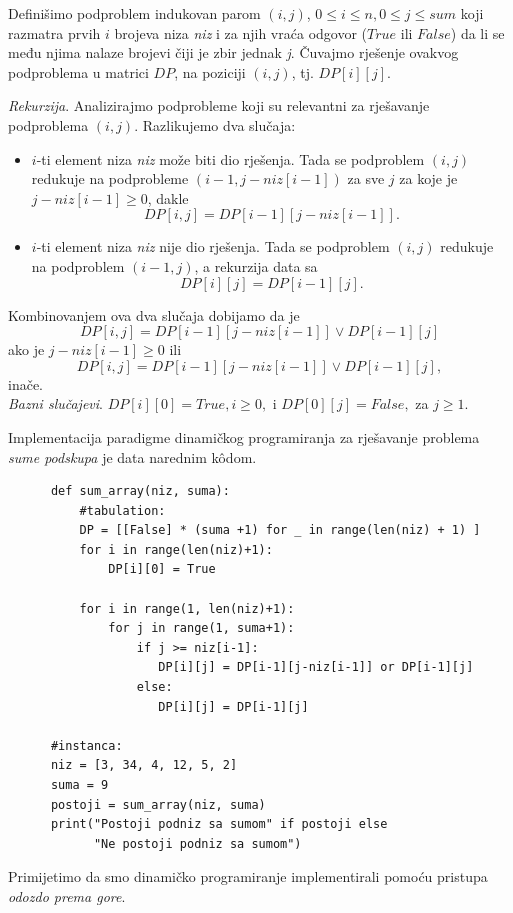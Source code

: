 \begin{solution}
   Definišimo podproblem indukovan parom $(i, j)$, $0 \leq i \leq n, 0 \leq j \leq sum$ koji razmatra prvih $i$ brojeva niza \emph{niz} i za njih vraća odgovor ($True$ ili $False$) da li se među njima nalaze brojevi čiji je zbir jednak \emph{j}. Čuvajmo rješenje ovakvog podproblema u matrici $DP$, na poziciji $(i,j)$, tj. $DP[i][j]$.  \\ \vspace{0.15cm}
   
   \textit{Rekurzija}. Analizirajmo podprobleme koji su relevantni za rješavanje podproblema $(i,j)$. Razlikujemo dva slučaja:
   \begin{itemize}
   	\item $i$-ti element niza \emph{niz} može biti dio rješenja. Tada se podproblem $(i, j)$ redukuje na podprobleme $(i-1, j-niz[i-1])$ za sve $j$ za koje je  $j-niz[i-1]\geq  0$, dakle %
   	    $$ DP[i, j] =    DP[i-1][ j- niz[i-1] ]. $$ %
   	\item $i$-ti element niza \emph{niz} nije dio rješenja. Tada se podproblem $(i, j)$ redukuje na podproblem $(i-1, j)$, a rekurzija data sa 
   	$$ DP[i][j] = DP[i-1][j]. $$

   \end{itemize}
   Kombinovanjem ova dva slučaja dobijamo da je
   $$DP[i, j] =   DP[i-1][ j- niz[i-1] ] \vee DP[i-1][j] $$ ako je  $j- niz[i-1]\geq 0$ ili  
     $$DP[i, j] =   DP[i-1][ j- niz[i-1] ] \vee DP[i-1][j],$$ inače. \\
   \textit{Bazni slučajevi}. $DP[i][0] = True, i \geq 0,$ i $DP[0][j] = False,$ za $ j \geq 1$. 
   
    Implementacija paradigme dinamičkog programiranja za rješavanje problema \emph{sume podskupa} je data narednim k\^odom. 
   
   \begin{verbatim}
   	  def sum_array(niz, suma):
   	      #tabulation:
   	      DP = [[False] * (suma +1) for _ in range(len(niz) + 1) ]
   	      for i in range(len(niz)+1):
   	          DP[i][0] = True
   	      
   	      for i in range(1, len(niz)+1):   
   	          for j in range(1, suma+1):
   	              if j >= niz[i-1]:
   	                 DP[i][j] = DP[i-1][j-niz[i-1]] or DP[i-1][j]
   	              else:
   	                 DP[i][j] = DP[i-1][j]
   	  
   	  #instanca:
   	  niz = [3, 34, 4, 12, 5, 2]
   	  suma = 9
   	  postoji = sum_array(niz, suma)
   	  print("Postoji podniz sa sumom" if postoji else  
   	        "Ne postoji podniz sa sumom")
   \end{verbatim}
\end{solution}
Primijetimo da smo dinamičko programiranje implementirali pomoću pristupa \textit{odozdo prema gore}. 


